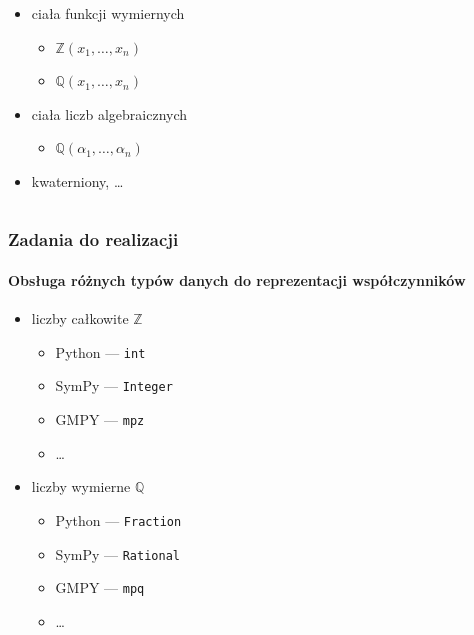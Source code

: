 \documentclass{beamer}
\begin{document}
\begin{frame}
\begin{columns}
\begin{column}[r]{0.5\textwidth}
\begin{itemize}
\begin{itemize}
                    \end{itemize}
                \item ciała funkcji wymiernych
                    \begin{itemize}
                        \item $\mathbb{Z}(x_1,\ldots,x_n)$
                        \item $\mathbb{Q}(x_1,\ldots,x_n)$
                    \end{itemize}
                \item ciała liczb algebraicznych
                    \begin{itemize}
                        \item $\mathbb{Q}(\alpha_1,\ldots,\alpha_n)$
                    \end{itemize}
                \item kwaterniony, \ldots
            \end{itemize}
        \end{column}
    \end{columns}
\end{frame}

\begin{frame}
    \frametitle{Zadania do realizacji}
    \framesubtitle{Obsługa różnych typów danych do reprezentacji współczynników}

    \begin{itemize}
        \item liczby całkowite $\mathbb{Z}$
            \begin{itemize}
                \item Python --- \texttt{int}
                \item SymPy --- \texttt{Integer}
                \item GMPY  --- \texttt{mpz}
                \item \ldots
            \end{itemize}
        \pause
        \item liczby wymierne $\mathbb{Q}$
            \begin{itemize}
                \item Python --- \texttt{Fraction}
                \item SymPy --- \texttt{Rational}
                \item GMPY  --- \texttt{mpq}
                \item \ldots
            \end{itemize}
    \end{itemize}
\end{frame}
\end{document}
